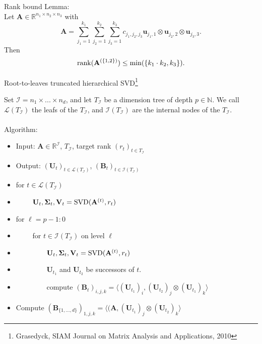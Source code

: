\documentclass{beamer}
\newcommand{\bgk}[1]{\boldsymbol{#1}}
\newcommand{\bSigma}{\bgk{\Sigma}}
\newcommand{\bvec}[1]{\mathbf{#1}}
\newcommand{\vu}{\bvec{u}}
\newcommand{\vA}{\bvec{A}}
\newcommand{\vB}{\bvec{B}}
\newcommand{\vU}{\bvec{U}}
\newcommand{\vV}{\bvec{V}}
\begin{document}
\begin{frame}{Rank bound}
Lemma:\\
Let $\vA \in \mathbb{R}^{n_1 \times n_2 \times n_3}$ with 
$$
\vA = \sum_{j_1=1}^{k_1}\sum_{j_2=1}^{k_2}\sum_{j_3=1}^{k_3}
c_{j_1,j_2,j_3} \vu_{j_1,1} \otimes \vu_{j_2,2} \otimes \vu_{j_3,3}.
$$
Then
$$
{\rm rank} (\vA^{(\{1,2\})}) \leq \min(\{k_1\cdot k_2, k_3\}).
$$
    
\end{frame}

\begin{frame}{Root-to-leaves truncated hierarchical SVD\footnote{Grasedyck, SIAM Journal on Matrix Analysis and Applications, 2010}}
\begin{footnotesize}
Set $\mathcal{I} = n_1\times ...\times n_d$, and let $T_{\mathcal{I}}$ be a dimension tree of depth $p\in\mathbb{N}$. We call $\mathcal{L}(T_\mathcal{I})$ the leafs of the $T_{\mathcal{I}}$, and $\mathcal{I}(T_\mathcal{I})$ are the internal nodes of the $T_{\mathcal{I}}$.\\
~\\
Algorithm:
\begin{itemize}
    \item[]Input: $\vA \in \mathbb{R}^{\mathcal{I}}$, $T_{\mathcal{I}}$, target rank $(r_t)_{t\in T_{\mathcal{I}}}$
    \item[]Output:  $(\vU_t)_{t\in\mathcal{L}(T_{\mathcal{I}})}$,  $(\vB_t)_{t\in\mathcal{I}(T_{\mathcal{I}})}$
    \item[] for $t\in\mathcal{L}(T_\mathcal{I})$
    \item[] $\qquad$ $\vU_t, \bSigma_t, \vV_t = {\rm SVD}(\vA^{(t)}, r_t)$ 
    \item[] for $\ell = p-1:0$
    \item[] $\qquad$ for $t\in \mathcal{I}(T_\mathcal{I})$ on level $\ell$
    \item[] $\qquad\qquad$ $\vU_t, \bSigma_t, \vV_t = {\rm SVD}(\vA^{(t)}, r_t)$
    \item[] $\qquad\qquad$ $\vU_{t_1}$ and $\vU_{t_2}$ be successors of $t$.
    \item[] $\qquad\qquad$ compute
    $
    (\vB_{t})_{i,j,k} = \langle (\vU_{t_1})_i, (\vU_{t_2})_j \otimes (\vU_{t_1})_k \rangle
    $
    \item[] Compute $
    (\vB_{\{1,...,d\}})_{1,j,k} = \langle (\vA, (\vU_{t_1})_j \otimes (\vU_{t_2})_k \rangle
    $
\end{itemize}
\end{footnotesize}

\end{frame}
\end{document}
